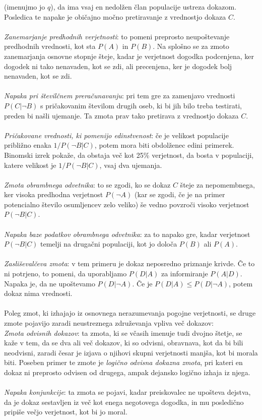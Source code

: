 \documentclass[12pt,a4paper]{amsart}
\theoremstyle{definition} %
\theoremstyle{plain} %
\begin{document}
(imenujmo jo $q$), da ima vsaj en nedolžen član populacije ustreza dokazom. Posledica te napake je običajno močno pretiravanje z vrednostjo
dokaza $C$.\\\\
\textit{Zanemarjanje predhodnih verjetnosti}: to pomeni preprosto neupoštevanje predhodnih vrednosti, kot sta $P(A)$ in $P(B)$. Na splošno
se za zmoto zanemarjanja osnovne stopnje šteje, kadar je verjetnost dogodka podcenjena, ker dogodek ni tako nenavaden, kot se zdi,
ali precenjena, ker je dogodek bolj nenavaden, kot se zdi.\\\\
\textit{Napaka pri številčnem preračunavanju}: pri tem gre za zamenjavo vrednosti $P(C \lvert \neg B)$ s pričakovanim številom drugih oseb,
ki bi jih bilo treba testirati, preden bi našli ujemanje. Ta zmota prav tako pretirava z vrednostjo dokaza $C$.\\\\
\textit{Pričakovane vrednosti, ki pomenijo edinstvenost}: če je velikost populacije približno enaka $1/P(\neg B \lvert C)$, potem mora biti
obdolženec edini primerek. Binomski izrek pokaže, da obstaja več kot 25\% verjetnost, da bosta v populaciji, katere velikost je $1/P(\neg B \lvert C)$,
vsaj dva ujemanja.\\\\
\textit{Zmota obrambnega odvetnika}: to se zgodi, ko se dokaz $C$ šteje za nepomembnega, ker visoka predhodna verjetnost $P(\neg A)$ (kar
se zgodi, če je na primer potencialno število osumljencev zelo veliko) še vedno povzroči visoko verjetnost $P(\neg B \lvert C)$. \\\\
\textit{Napaka baze podatkov obrambnega odvetnika}: za to napako gre, kadar verjetnost $P(\neg B \lvert C)$ temelji na drugačni populaciji,
kot jo določa $P(B)$ ali $P(A)$.\\\\
\textit{Zasliševalčeva zmota}: v tem primeru je dokaz neposredno priznanje krivde. Če to ni potrjeno, to pomeni, da uporabljamo $P(D \lvert A)$ za
informiranje $P(A \lvert D)$. Napaka je, da ne upoštevamo $P(D \lvert \neg A)$. Če je $P(D \lvert A) \leq P(D \lvert \neg A)$, potem dokaz
nima vrednosti.\\\\
Poleg zmot, ki izhajajo iz osnovnega nerazumevanja pogojne verjetnosti, se druge zmote pojavijo zaradi neustreznega združevanja vpliva več dokazov:\\
\textit{Zmota odvisnih dokazov}: ta zmota, ki se včasih imenuje tudi dvojno štetje, se kaže v tem, da se dva ali več dokazov, ki so odvisni,
obravnava, kot da bi bili neodvisni, zaradi česar je izjava o njihovi skupni verjetnosti manjša, kot bi morala biti. Poseben primer te zmote je
\textit{logično odvisna dokazna zmota}, pri kateri en dokaz ni preprosto odvisen od drugega, ampak dejansko logično izhaja iz njega.\\\\
\textit{Napaka konjunkcije}: ta zmota se pojavi, kadar preiskovalec ne upošteva dejstva, da je dokaz sestavljen iz več kot enega negotovega dogodka,
in mu posledično pripiše večjo verjetnost, kot bi jo moral.
\end{document}
